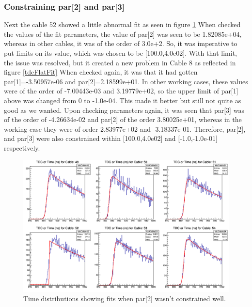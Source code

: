 \documentclass[12pt,epsfig]{article}
\begin{document}
\subsubsection{Constraining par[2] and par[3]}

Next the cable 52 showed a little abnormal fit as seen in figure \ref{tdcSharp2}
When checked the values of the fit parameters, the value of par[2] was seen to be 1.82085e+04,
whereas in other cables, it was of the order of 3.0e+2. So, it was imperative to put 
limits on its value, which was chosen to be [100.0,4.0e02]. With that limit, the issue
was resolved, but it created a new problem in Cable 8 as reflected in figure \ref{tdcFlatFit}
When checked again, it was that it had gotten  par[1]=-3.50957e-06 and par[2]=2.18599e+01. 
In other working cases, these values were of the order of -7.00443e-03 and 3.19779e+02, so 
the upper limit of par[1] above was changed from 0 to -1.0e-04. This made it better but 
still not quite as good as we wanted. Upon checking parameters again, it was seen that par[3] 
was of the order of -4.26634e-02 and par[2] of the order 3.80025e+01, whereas in the working case 
they were of order 2.83977e+02 and  -3.18337e-01. Therefore, par[2], and par[3] were also 
constrained within [100.0,4.0e02] and [-1.0,-1.0e-01] respectively.

\begin{figure}
    \centering
    \includegraphics[width=1.0\textwidth]{Figures/tdcForRun068_Cables49to54.png}
    \caption{Time distributions showing fits when par[2] wasn't constrained well.}
    \label{tdcSharp2}
\end{figure}
\end{document}
